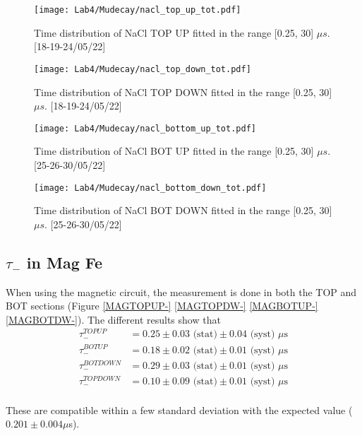 \documentclass[10pt,a4paper,twocolumn]{article}
\begin{document}
\begin{figure}[h!]
\centering
\caption{Time distribution of NaCl TOP UP fitted in the range [0.25, 30] $\mu s$. [18-19-24/05/22]}
\texttt{[image: Lab4/Mudecay/nacl\_top\_up\_tot.pdf]} 
\label{NACLTOPUP-}
\end{figure}

\begin{figure}[h!]
\centering
\caption{Time distribution of NaCl TOP DOWN fitted in the range [0.25, 30] $\mu s$. [18-19-24/05/22]}
\texttt{[image: Lab4/Mudecay/nacl\_top\_down\_tot.pdf]}
\label{NACLTOPDW-}
\end{figure}

\begin{figure}[h!]
\centering
\caption{Time distribution of NaCl BOT UP fitted in the range [0.25, 30] $\mu s$. [25-26-30/05/22]}
\texttt{[image: Lab4/Mudecay/nacl\_bottom\_up\_tot.pdf]} 
\label{NACLBOTUP-}
\end{figure}

\begin{figure}[h!]
\centering
\caption{Time distribution of NaCl BOT DOWN fitted in the range [0.25, 30] $\mu s$. [25-26-30/05/22]}
\texttt{[image: Lab4/Mudecay/nacl\_bottom\_down\_tot.pdf]} 
\label{NACLBOTDW-}
\end{figure}


\subsection{$\tau_-$ in Mag Fe}
When using the magnetic circuit, the measurement is done in both the TOP and BOT sections (Figure \ref{MAGTOPUP-} \ref{MAGTOPDW-} \ref{MAGBOTUP-} \ref{MAGBOTDW-}). The different results show that 
\begin{align*}
    \tau_-^{TOP UP} & =  0.25\pm 0.03 \text{ (stat)} \pm 0.04 \text{ (syst) }\mu \text{s} \\
        \tau_-^{BOT UP} &= 0.18\pm 0.02 \text{ (stat)} \pm 0.01 \text{ (syst) }\mu \text{s}\\
        \tau_-^{BOT DOWN} &= 0.29\pm 0.03 \text{ (stat)} \pm 0.01 \text{ (syst) }\mu\text{s}\\
        \tau_-^{TOP DOWN} &=  0.10\pm 0.09 \text{ (stat)} \pm 0.01 \text{ (syst) }\mu\text{s}\\
\end{align*}

These are compatible within a few standard deviation with the expected value ($0.201 \pm 0.004 \mu$s).
\end{document}
